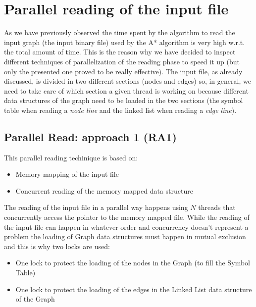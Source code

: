 \documentclass[twocolumn, switch]{article} %
\begin{document}
\section{Parallel reading of the input file}
As we have previously observed the time spent by the algorithm to read the input graph
(the input binary file) used by the A* algorithm is very high w.r.t. the total
amount of time. This is the reason why we have decided to inspect different techniques of
parallelization of the reading phase to speed it up (but only the presented one proved
to be really effective). The input file, as already discussed,
is divided in two different sections (nodes and edges) so, in general, we need to take care of which
section a given thread is working on because different data structures of the graph need to
be loaded in the two sections (the symbol table when reading a \textit{node line} and the linked list when
reading a \textit{edge line}).

\subsection{Parallel Read: approach 1 (RA1)}
This parallel reading techinique is based on:
\begin{itemize}
  \item Memory mapping of the input file
  \item Concurrent reading of the memory mapped data structure
\end{itemize}
The reading of the input file in a parallel way happens using $N$ threads that concurrently access
the pointer to the memory mapped file. While the reading of the input file can happen in whatever order
and concurrency doesn't represent a problem the loading of Graph data structures must happen in
mutual exclusion and this is why two locks are used:
\begin{itemize}
  \item One lock to protect the loading of the nodes in the Graph (to fill the Symbol Table)
  \item One lock to protect the loading of the edges in the Linked List data structure of the Graph
\end{itemize}
\end{document}
